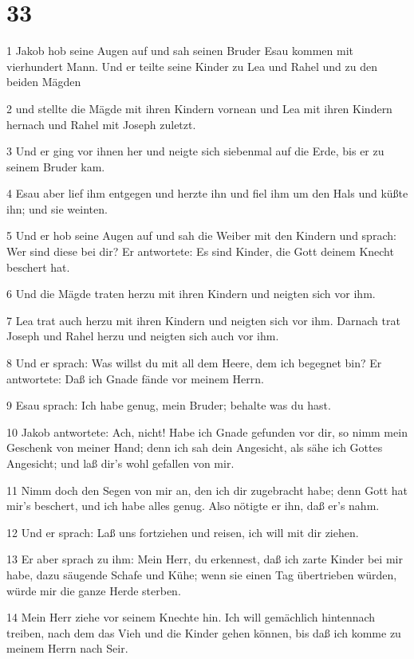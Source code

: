 \chapter{33}

\par 1 Jakob hob seine Augen auf und sah seinen Bruder Esau kommen mit vierhundert Mann. Und er teilte seine Kinder zu Lea und Rahel und zu den beiden Mägden
\par 2 und stellte die Mägde mit ihren Kindern vornean und Lea mit ihren Kindern hernach und Rahel mit Joseph zuletzt.
\par 3 Und er ging vor ihnen her und neigte sich siebenmal auf die Erde, bis er zu seinem Bruder kam.
\par 4 Esau aber lief ihm entgegen und herzte ihn und fiel ihm um den Hals und küßte ihn; und sie weinten.
\par 5 Und er hob seine Augen auf und sah die Weiber mit den Kindern und sprach: Wer sind diese bei dir? Er antwortete: Es sind Kinder, die Gott deinem Knecht beschert hat.
\par 6 Und die Mägde traten herzu mit ihren Kindern und neigten sich vor ihm.
\par 7 Lea trat auch herzu mit ihren Kindern und neigten sich vor ihm. Darnach trat Joseph und Rahel herzu und neigten sich auch vor ihm.
\par 8 Und er sprach: Was willst du mit all dem Heere, dem ich begegnet bin? Er antwortete: Daß ich Gnade fände vor meinem Herrn.
\par 9 Esau sprach: Ich habe genug, mein Bruder; behalte was du hast.
\par 10 Jakob antwortete: Ach, nicht! Habe ich Gnade gefunden vor dir, so nimm mein Geschenk von meiner Hand; denn ich sah dein Angesicht, als sähe ich Gottes Angesicht; und laß dir's wohl gefallen von mir.
\par 11 Nimm doch den Segen von mir an, den ich dir zugebracht habe; denn Gott hat mir's beschert, und ich habe alles genug. Also nötigte er ihn, daß er's nahm.
\par 12 Und er sprach: Laß uns fortziehen und reisen, ich will mit dir ziehen.
\par 13 Er aber sprach zu ihm: Mein Herr, du erkennest, daß ich zarte Kinder bei mir habe, dazu säugende Schafe und Kühe; wenn sie einen Tag übertrieben würden, würde mir die ganze Herde sterben.
\par 14 Mein Herr ziehe vor seinem Knechte hin. Ich will gemächlich hintennach treiben, nach dem das Vieh und die Kinder gehen können, bis daß ich komme zu meinem Herrn nach Seir.
